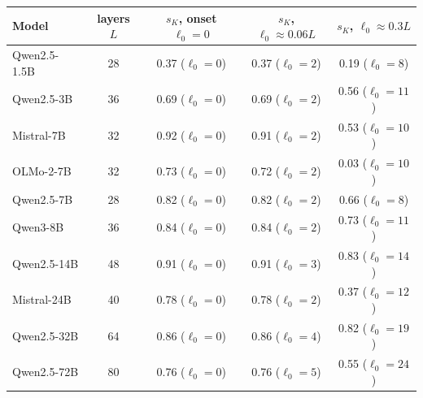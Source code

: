 \begin{tabular}{lcccc}
\toprule
Model & layers $L$ & $s_K$, onset $\ell_0{=}0$ & $s_K$, $\ell_0{\approx}0.06L$ & $s_K$, $\ell_0{\approx}0.3L$ \\
\midrule
Qwen2.5-1.5B & 28 & 0.37 ($\ell_0{=}0$) & 0.37 ($\ell_0{=}2$) & 0.19 ($\ell_0{=}8$) \\
Qwen2.5-3B & 36 & 0.69 ($\ell_0{=}0$) & 0.69 ($\ell_0{=}2$) & 0.56 ($\ell_0{=}11$) \\
Mistral-7B & 32 & 0.92 ($\ell_0{=}0$) & 0.91 ($\ell_0{=}2$) & 0.53 ($\ell_0{=}10$) \\
OLMo-2-7B & 32 & 0.73 ($\ell_0{=}0$) & 0.72 ($\ell_0{=}2$) & 0.03 ($\ell_0{=}10$) \\
Qwen2.5-7B & 28 & 0.82 ($\ell_0{=}0$) & 0.82 ($\ell_0{=}2$) & 0.66 ($\ell_0{=}8$) \\
Qwen3-8B & 36 & 0.84 ($\ell_0{=}0$) & 0.84 ($\ell_0{=}2$) & 0.73 ($\ell_0{=}11$) \\
Qwen2.5-14B & 48 & 0.91 ($\ell_0{=}0$) & 0.91 ($\ell_0{=}3$) & 0.83 ($\ell_0{=}14$) \\
Mistral-24B & 40 & 0.78 ($\ell_0{=}0$) & 0.78 ($\ell_0{=}2$) & 0.37 ($\ell_0{=}12$) \\
Qwen2.5-32B & 64 & 0.86 ($\ell_0{=}0$) & 0.86 ($\ell_0{=}4$) & 0.82 ($\ell_0{=}19$) \\
Qwen2.5-72B & 80 & 0.76 ($\ell_0{=}0$) & 0.76 ($\ell_0{=}5$) & 0.55 ($\ell_0{=}24$) \\
\bottomrule
\end{tabular}
